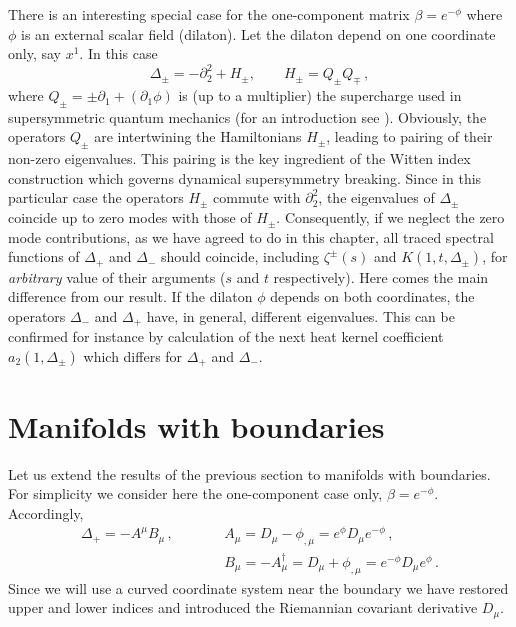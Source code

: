 \documentclass[a4paper,12pt]{article}
\begin{document}
There is an interesting special case 
for the one-component matrix $\beta =e^{-\phi}$ where
$\phi$ is an external scalar field (dilaton). Let the
dilaton depend on one coordinate only, say $x^1$.
In this case 
\begin{equation}
\Delta_\pm =-\partial_2^2 +H_\pm ,\qquad
H_\pm =Q_\pm Q_\mp \,,{}  \label{sups}
\end{equation}
where $Q_\pm =\pm \partial_1 +(\partial_1\phi )$ is
(up to a multiplier) the supercharge used in supersymmetric
quantum mechanics (for an introduction see \cite{Schwabl}).
Obviously, the operators $Q_\pm$ are intertwining
the Hamiltonians $H_\pm$, leading to pairing of their
non-zero eigenvalues. This pairing is the key ingredient
of the Witten index construction \cite{Witten82} which
governs dynamical supersymmetry breaking. Since in this
particular case the operators $H_\pm$ commute with $\partial_2^2$,
the eigenvalues of $\Delta_\pm$ coincide up to zero modes with those
of $H_\pm$. Consequently, if we neglect the zero mode
contributions, as we have agreed to do in this chapter,
all traced spectral functions of $\Delta_+$ and $\Delta_-$
should coincide, including $\zeta^\pm (s)$ 
and $K(1,t,\Delta_\pm)$, for {\it arbitrary} value
of their arguments ($s$ and $t$ respectively).
Here comes the main difference from our result. 
If the dilaton $\phi$ depends on both coordinates,
the operators $\Delta_-$ and $\Delta_+$ have, in
general, different eigenvalues. This can be confirmed
for instance by calculation of the next heat kernel
coefficient $a_2(1,\Delta_\pm )$ which differs for
$\Delta_+$ and $\Delta_-$. 



\section{Manifolds with boundaries}
Let us extend the results of the previous section to manifolds
with boundaries. For simplicity we consider here the one-component
case only, $\beta =e^{-\phi}$. Accordingly,
\begin{eqnarray}
\Delta_+=-A^\mu B_\mu \,,\qquad && A_\mu =
D_\mu -\phi_{,\mu}=e^\phi D_\mu e^{-\phi} \,, \nonumber \\
&&B_\mu =-A_\mu^\dag =D_\mu +\phi_{,\mu}=e^{-\phi} D_\mu
e^\phi \,.
\label{1AB}
\end{eqnarray}
Since we will use a curved coordinate system near the boundary
we have restored upper and lower indices and introduced the
Riemannian covariant derivative $D_{\mu}$.
\end{document}

